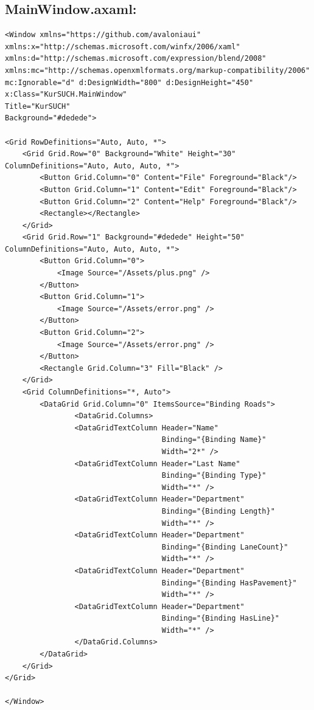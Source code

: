 \documentclass[14pt]{extarticle}
\begin{document}
\subsection{MainWindow.axaml:}
\begin{verbatim}
<Window xmlns="https://github.com/avaloniaui"
xmlns:x="http://schemas.microsoft.com/winfx/2006/xaml"
xmlns:d="http://schemas.microsoft.com/expression/blend/2008"
xmlns:mc="http://schemas.openxmlformats.org/markup-compatibility/2006"
mc:Ignorable="d" d:DesignWidth="800" d:DesignHeight="450"
x:Class="KurSUCH.MainWindow"
Title="KurSUCH"
Background="#dedede">

<Grid RowDefinitions="Auto, Auto, *">
    <Grid Grid.Row="0" Background="White" Height="30" ColumnDefinitions="Auto, Auto, Auto, *">
        <Button Grid.Column="0" Content="File" Foreground="Black"/>
        <Button Grid.Column="1" Content="Edit" Foreground="Black"/>
        <Button Grid.Column="2" Content="Help" Foreground="Black"/>
        <Rectangle></Rectangle>
    </Grid>
    <Grid Grid.Row="1" Background="#dedede" Height="50" ColumnDefinitions="Auto, Auto, Auto, *">
        <Button Grid.Column="0">
            <Image Source="/Assets/plus.png" />
        </Button>
        <Button Grid.Column="1">
            <Image Source="/Assets/error.png" />
        </Button>
        <Button Grid.Column="2">
            <Image Source="/Assets/error.png" />
        </Button>
        <Rectangle Grid.Column="3" Fill="Black" />
    </Grid>
    <Grid ColumnDefinitions="*, Auto">
        <DataGrid Grid.Column="0" ItemsSource="Binding Roads">
                <DataGrid.Columns>
                <DataGridTextColumn Header="Name" 
                                    Binding="{Binding Name}" 
                                    Width="2*" />
                <DataGridTextColumn Header="Last Name" 
                                    Binding="{Binding Type}" 
                                    Width="*" />
                <DataGridTextColumn Header="Department" 
                                    Binding="{Binding Length}" 
                                    Width="*" />
                <DataGridTextColumn Header="Department" 
                                    Binding="{Binding LaneCount}" 
                                    Width="*" />
                <DataGridTextColumn Header="Department" 
                                    Binding="{Binding HasPavement}" 
                                    Width="*" />
                <DataGridTextColumn Header="Department" 
                                    Binding="{Binding HasLine}" 
                                    Width="*" />
                </DataGrid.Columns>
        </DataGrid>
    </Grid>
</Grid>

</Window>

\end{verbatim}
\end{document}
